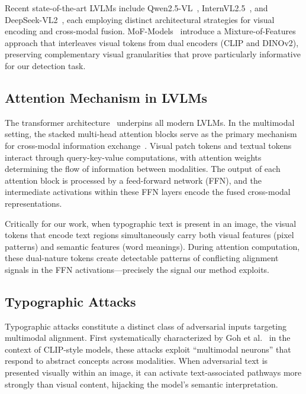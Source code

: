 \documentclass[preprint,12pt]{elsarticle}
\begin{document}
Recent state-of-the-art LVLMs include Qwen2.5-VL~\cite{wu2025qwen}, InternVL2.5~\cite{chen2024expanding}, and DeepSeek-VL2~\cite{wu2024deepseek}, each employing distinct architectural strategies for visual encoding and cross-modal fusion. MoF-Models~\cite{tong2024eyes} introduce a Mixture-of-Features approach that interleaves visual tokens from dual encoders (CLIP and DINOv2), preserving complementary visual granularities that prove particularly informative for our detection task.

\subsection{Attention Mechanism in LVLMs}

The transformer architecture~\cite{vaswani2017attention} underpins all modern LVLMs. In the multimodal setting, the stacked multi-head attention blocks serve as the primary mechanism for cross-modal information exchange~\cite{chen2020uniter}. Visual patch tokens and textual tokens interact through query-key-value computations, with attention weights determining the flow of information between modalities. The output of each attention block is processed by a feed-forward network (FFN), and the intermediate activations within these FFN layers encode the fused cross-modal representations.

Critically for our work, when typographic text is present in an image, the visual tokens that encode text regions simultaneously carry both visual features (pixel patterns) and semantic features (word meanings). During attention computation, these dual-nature tokens create detectable patterns of conflicting alignment signals in the FFN activations---precisely the signal our method exploits.

\subsection{Typographic Attacks}

Typographic attacks constitute a distinct class of adversarial inputs targeting multimodal alignment. First systematically characterized by Goh et al.~\cite{goh2021multimodal} in the context of CLIP-style models, these attacks exploit ``multimodal neurons'' that respond to abstract concepts across modalities. When adversarial text is presented visually within an image, it can activate text-associated pathways more strongly than visual content, hijacking the model's semantic interpretation.
\end{document}
